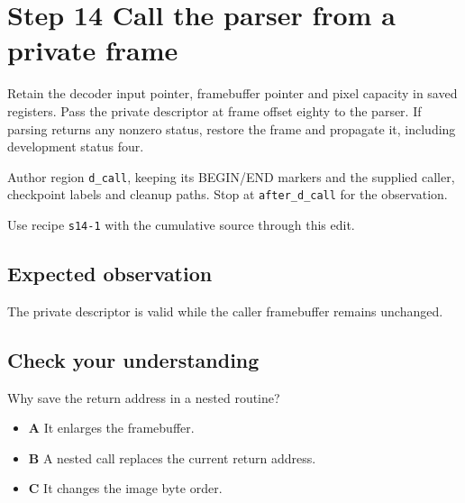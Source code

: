 \section{Step 14 Call the parser from a private frame}\label{ppm-s14}

Retain the decoder input pointer, framebuffer pointer and pixel capacity in saved registers. Pass the private descriptor at frame offset eighty to the parser. If parsing returns any nonzero status, restore the frame and propagate it, including development status four.

Author region \texttt{d\_call}, keeping its BEGIN/END markers and the supplied caller, checkpoint labels and cleanup paths. Stop at \texttt{after\_d\_call} for the observation.

Use recipe \texttt{s14-1} with the cumulative source through this edit.

\subsection{Expected observation}
The private descriptor is valid while the caller framebuffer remains unchanged.

\subsection{Check your understanding}
Why save the return address in a nested routine?

\begin{itemize}
  \item \textbf{A} It enlarges the framebuffer.
  \item \textbf{B} A nested call replaces the current return address.
  \item \textbf{C} It changes the image byte order.
\end{itemize}
